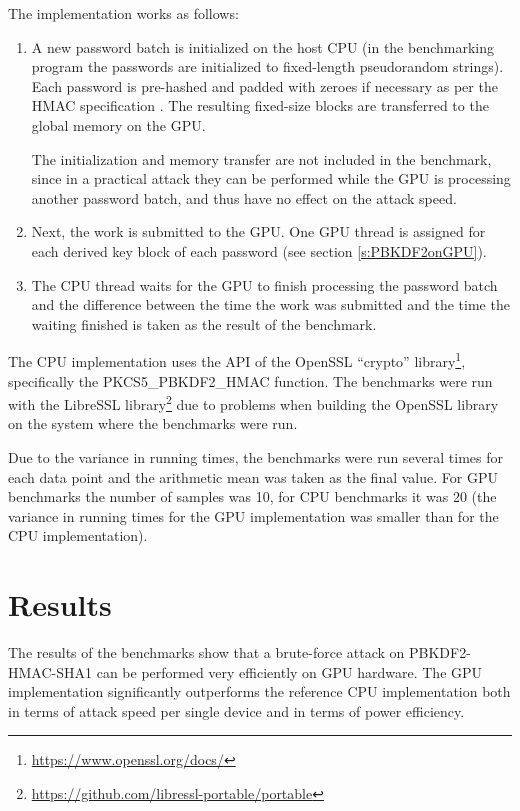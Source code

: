 \documentclass[12pt,oneside]{fithesis2}
\begin{document}
      The implementation works as follows:
      \begin{enumerate}
        \item A new password batch is initialized on the host CPU (in the benchmarking program the passwords are initialized to fixed-length pseudorandom strings). Each password is pre-hashed and padded with zeroes if necessary as per the HMAC specification \cite{rfc2104}. The resulting fixed-size blocks are transferred to the global memory on the GPU.
        
              The initialization and memory transfer are not included in the benchmark, since in a practical attack they can be performed while the GPU is processing another password batch, and thus have no effect on the attack speed.
        \item Next, the work is submitted to the GPU. One GPU thread is assigned for each derived key block of each password (see section \ref{s:PBKDF2onGPU}).
        \item The CPU thread waits for the GPU to finish processing the password batch and the difference between the time the work was submitted and the time the waiting finished is taken as the result of the benchmark.
      \end{enumerate}
      
      The CPU implementation uses the API of the OpenSSL ``crypto'' library\footnote{\url{https://www.openssl.org/docs/}}, specifically the PKCS5\_PBKDF2\_HMAC function. The benchmarks were run with the LibreSSL library\footnote{\url{https://github.com/libressl-portable/portable}} due to problems when building the OpenSSL library on the system where the benchmarks were run.
      
      Due to the variance in running times, the benchmarks were run several times for each data point and the arithmetic mean was taken as the final value. For GPU benchmarks the number of samples was 10, for CPU benchmarks it was 20 (the variance in running times for the GPU implementation was smaller than for the CPU implementation).
      
      \section{Results} \label{s:results}
      The results of the benchmarks show that a brute-force attack on PBKDF2-HMAC-SHA1 can be performed very efficiently on GPU hardware. The GPU implementation significantly outperforms the reference CPU implementation both in terms of attack speed per single device and in terms of power efficiency.
      
\end{document}
